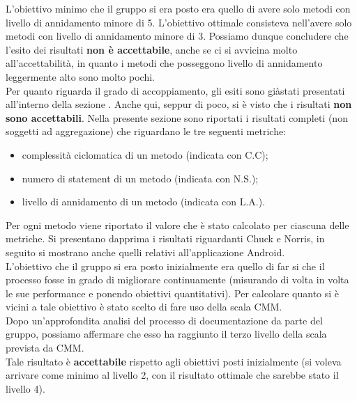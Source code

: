 				L'obiettivo minimo che il gruppo si era posto era quello di avere solo metodi con livello di annidamento minore di 5. L'obiettivo ottimale consisteva nell'avere solo metodi con livello di annidamento minore di 3. Possiamo dunque concludere che l'esito dei risultati \textbf{non è accettabile}, anche se ci si avvicina molto all'accettabilità, in quanto i metodi che posseggono livello di annidamento leggermente alto sono molto pochi.\\
				Per quanto riguarda il grado di accoppiamento, gli esiti sono giàstati presentati all'interno della sezione . Anche qui, seppur di poco, si è visto che i risultati \textbf{non sono accettabili}.
				Nella presente sezione sono riportati i risultati completi (non soggetti ad aggregazione) che riguardano le tre seguenti metriche:
				\begin{itemize}
					\item complessità ciclomatica di un metodo (indicata con C.C);
					\item numero di statement di un metodo (indicata con N.S.);
					\item livello di annidamento di un metodo (indicata con L.A.).
				\end{itemize}
				Per ogni metodo viene riportato il valore che è stato calcolato per ciascuna delle metriche. Si presentano dapprima i risultati riguardanti Chuck e Norris, in seguito si mostrano anche quelli relativi all'applicazione Android.\\
				
				

			 
				L'obiettivo che il gruppo si era posto inizialmente era quello di far si che il processo fosse in grado di migliorare continuamente (misurando di volta in volta le sue performance e ponendo obiettivi quantitativi). Per calcolare quanto si è vicini a tale obiettivo è stato scelto di fare uso della scala CMM.\\
				Dopo un'approfondita analisi del processo di documentazione da parte del gruppo, possiamo affermare che esso ha raggiunto il terzo livello della scala prevista da CMM.\\
				Tale risultato è \textbf{accettabile} rispetto agli obiettivi posti inizialmente (si voleva arrivare come minimo al livello 2, con il risultato ottimale che sarebbe stato il livello 4).
			
